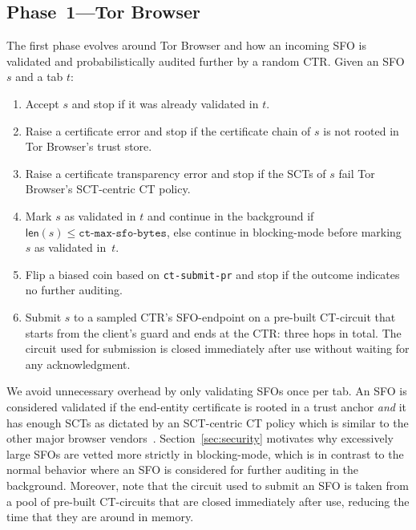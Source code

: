 \subsection{Phase~1---Tor Browser} \label{sec:base:phase1}
The first phase evolves around Tor Browser and how an incoming SFO is validated
and probabilistically audited further by a random CTR.  Given an SFO $s$ and
a tab $t$:
\begin{enumerate}
	\item Accept $s$ and stop if it was already validated in $t$.
	\item Raise a certificate error and stop if the certificate chain of $s$
		is not rooted in Tor Browser's trust store.
	\item Raise a certificate transparency error and stop if the SCTs of $s$
		fail Tor Browser's SCT-centric CT policy.
	\item Mark $s$ as validated in $t$ and continue in the background if
		$\mathsf{len}(s) \le \texttt{ct-max-sfo-bytes}$, else continue in
		blocking-mode before marking $s$ as validated in~$t$.
	\item Flip a biased coin based on \texttt{ct-submit-pr} and stop if the
		outcome indicates no further auditing.
	\item Submit $s$ to a sampled CTR's SFO-endpoint on a pre-built CT-circuit
		that starts from the client's guard and ends at the CTR: three hops in
		total.  The circuit used for submission is closed immediately after
		use without waiting for any acknowledgment.
\end{enumerate}

We avoid unnecessary overhead by only validating SFOs once per tab.  An SFO is
considered validated if the end-entity certificate is rooted in a trust anchor
\emph{and} it has enough SCTs as dictated by an SCT-centric CT policy which is
similar to the other major browser vendors~\cite{chrome-policy,safari-policy}.
Section~\ref{sec:security} motivates why excessively large SFOs are vetted more
strictly in blocking-mode, which is in contrast to the normal behavior where an
SFO is considered for further auditing in the background.  Moreover, note that
the circuit used to submit an SFO is taken from a pool of pre-built CT-circuits
that are closed immediately after use, reducing the time that they are around in
memory.

%
%


